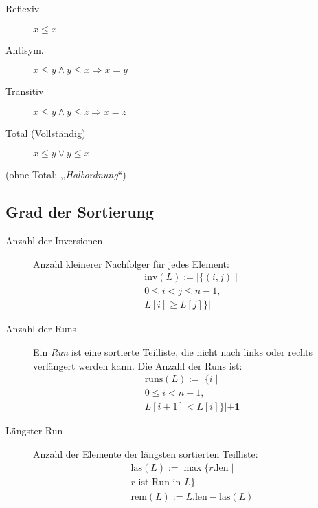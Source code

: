 \begin{description}
  \item[Reflexiv] $x \leq x$
  \item[Antisym.] $x \leq y \land y \leq x \Rightarrow x = y$
  \item[Transitiv] $x \leq y \land y \leq z \Rightarrow x = z$
  \item[Total (Vollständig)] $x \leq y \lor y \leq x$
\end{description}

(ohne Total: ,,\emph{Halbordnung}``)

\subsection{Grad der Sortierung}

\begin{mzImportant}
  \begin{description}
    \item [Anzahl der Inversionen]
          Anzahl kleinerer Nachfolger für jedes Element:
          \begin{gather*}
            \text{inv} (L) := |\{ (i,j) \mid \\
            0 \leq i < j \leq n - 1, \\
            L[i] \geq L[j] \}|
          \end{gather*}

    \item [Anzahl der Runs]
          Ein \emph{Run} ist eine sortierte Teilliste, die nicht nach links oder rechts verlängert werden kann.
          Die Anzahl der Runs ist:
          \begin{gather*}
            \text{runs} (L) := |\{ i \mid \\
            0 \leq i < n - 1, \\
            L[i + 1] < L[i]  \}| \mathbf{+ 1}
          \end{gather*}

    \item [Längster Run]
          Anzahl der Elemente der längsten sortierten Teilliste:
          \begin{gather*}
            \text{las} (L) := \max \{ r.\text{len} \mid \\
            r \text{ ist Run in } L \} \\
            \text{rem} (L) := L.\text{len} - \text{las} (L)
          \end{gather*}
  \end{description}
\end{mzImportant}

